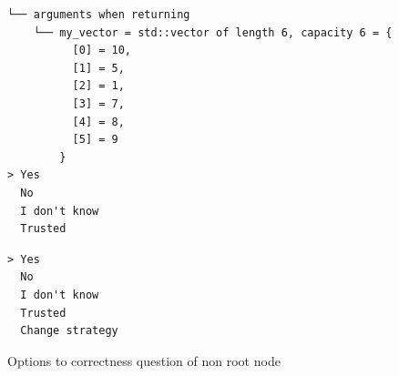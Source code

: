 \begin{figure}[h]
\begin{verbatim}
└── arguments when returning                                                                                                                          
    └── my_vector = std::vector of length 6, capacity 6 = {                                                                                           
          [0] = 10,                                                                                                                                   
          [1] = 5,                                                                                                                                    
          [2] = 1,                                                                                                                                    
          [3] = 7,                                                                                                                                    
          [4] = 8,                                                                                                                                    
          [5] = 9                                                                                                                                     
        }                                                                                                                                             
> Yes                                                                                                                                                 
  No                                                                                                                                                  
  I don't know                                                                                                                                        
  Trusted
    \end{verbatim}
\end{figure}

\begin{figure}[h]
    \centering
    \caption{Options to correctness question of non root node}
    \label{fig:correctnessQuestionNonRootOptions}
    \begin{verbatim}
> Yes                                                                                                                                                 
  No                                                                                                                                                  
  I don't know                                                                                                                                        
  Trusted
  Change strategy
    \end{verbatim}
\end{figure}

